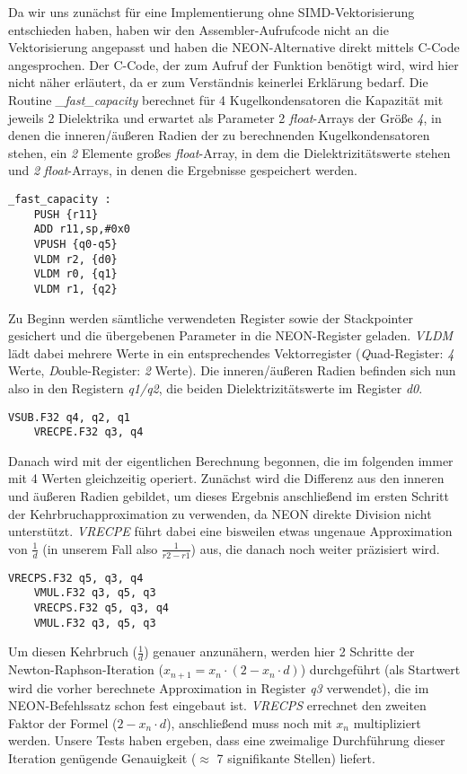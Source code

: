 \documentclass[11pt]{scrartcl}
\begin{document}
Da wir uns zunächst für eine Implementierung ohne SIMD-Vektorisierung entschieden haben, haben wir den Assembler-Aufrufcode nicht an die Vektorisierung angepasst und haben die NEON-Alternative direkt mittels C-Code angesprochen. Der C-Code, der zum Aufruf der Funktion benötigt wird, wird hier nicht näher erläutert, da er zum Verständnis keinerlei Erklärung bedarf. Die Routine \emph{\_fast\_capacity} berechnet für 4 Kugelkondensatoren die Kapazität mit jeweils 2 Dielektrika und erwartet als Parameter 2 \emph{float}-Arrays der Größe \emph{4}, in denen die inneren/äußeren Radien der zu berechnenden Kugelkondensatoren stehen, ein \emph{2} Elemente großes \emph{float}-Array, in dem die Dielektrizitätswerte stehen und \emph{2} \emph{float}-Arrays, in denen die Ergebnisse gespeichert werden.
\begin{lstlisting}[language={[x86masm]Assembler}]
_fast_capacity :
	PUSH {r11}
	ADD r11,sp,#0x0
	VPUSH {q0-q5}
	VLDM r2, {d0}
	VLDM r0, {q1}
	VLDM r1, {q2}
\end{lstlisting}
Zu Beginn werden sämtliche verwendeten Register sowie der Stackpointer gesichert und die übergebenen Parameter in die NEON-Register geladen. \emph{VLDM} lädt dabei mehrere Werte in ein entsprechendes Vektorregister (\emph{Q}uad-Register: \emph{4} Werte, \emph{D}ouble-Register: \emph{2} Werte). Die inneren/äußeren Radien befinden sich nun also in den Registern \emph{q1/q2}, die beiden Dielektrizitätswerte im Register \emph{d0}.
\begin{lstlisting}[language={[x86masm]Assembler}]
	VSUB.F32 q4, q2, q1
	VRECPE.F32 q3, q4
\end{lstlisting}
Danach wird mit der eigentlichen Berechnung begonnen, die im folgenden immer mit 4 Werten gleichzeitig operiert. Zunächst wird die Differenz aus den inneren und äußeren Radien gebildet, um dieses Ergebnis anschließend im ersten Schritt der Kehrbruchapproximation zu verwenden, da NEON direkte Division nicht unterstützt. \emph{VRECPE} führt dabei eine bisweilen etwas ungenaue Approximation von $\frac{1}{d}$ (in unserem Fall also $\frac{1}{r2-r1}$) aus, die danach noch weiter präzisiert wird.
\begin{lstlisting}[language={[x86masm]Assembler}]
	VRECPS.F32 q5, q3, q4
	VMUL.F32 q3, q5, q3
	VRECPS.F32 q5, q3, q4
	VMUL.F32 q3, q5, q3
\end{lstlisting}
Um diesen Kehrbruch ($\frac{1}{d}$) genauer anzunähern, werden hier 2 Schritte der Newton-Raphson-Iteration ($x_{n+1}=x_{n} \cdot (2 - x_{n} \cdot d)$) durchgeführt (als Startwert wird die vorher berechnete Approximation in Register \emph{q3} verwendet), die im NEON-Befehlssatz schon fest eingebaut ist. \emph{VRECPS} errechnet den zweiten Faktor der Formel ($2 - x_{n} \cdot d$), anschließend muss noch mit $x_{n}$ multipliziert werden. Unsere Tests haben ergeben, dass eine zweimalige Durchführung dieser Iteration genügende Genauigkeit ($\approx$ 7 signifikante Stellen) liefert.
\end{document}

